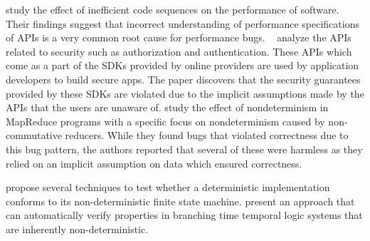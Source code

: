 \cite{Jin:2012:UDR:2254064.2254075} study the effect of inefficient code sequences on the performance of software.
Their findings suggest that incorrect understanding of performance specifications of APIs is a very common root cause for
performance bugs. ~\cite{Rui:2013:180377} analyze the APIs related to security such as authorization and authentication.
These APIs which come as a part of the SDKs provided by online providers are used by application developers to 
build secure apps. The paper discovers that the security guarantees provided by these SDKs are violated due to
the implicit assumptions made by the APIs that the users are unaware of. \cite{Xiao:2014:NMC:2591062.2591177}
study the effect of nondeterminism in MapReduce programs with a specific focus on nondeterminism caused by
non-commutative reducers. While they found bugs that violated correctness due to this bug pattern,
the authors reported that several of these were harmless as they relied on an implicit assumption on data
which ensured correctness. 

\cite{Petrenko1996,Petrenko:1993:NSM:648128.761244,Savor:1997:639710,Hierons:2004:TCD:1040993.1040998} propose several techniques to test whether a
deterministic implementation conforms to its non-deterministic finite state machine.
\cite{Cook:2013:RNP:2491956.2491969} present an approach that can automatically verify properties
in branching time temporal logic systems that are inherently non-deterministic.


